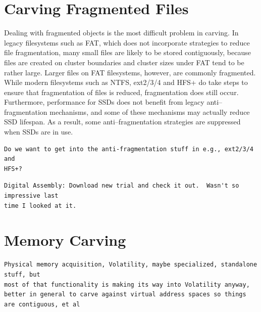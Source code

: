 \section{Carving Fragmented Files}

Dealing with fragmented objects is the most difficult problem in carving.  In legacy filesystems such as FAT, which does not incorporate strategies to reduce file fragmentation, many small files are likely to be stored contiguously, because files are created on cluster boundaries and cluster sizes under FAT tend to be rather large.  Larger files on FAT filesystems, however, are commonly fragmented\cite{dfrws2007:SimsonLGarfinkel}.  While modern filesystems such as NTFS, ext2/3/4 and HFS+ do take steps to ensure that fragmentation of files is reduced, fragmentation does still occur.  Furthermore, performance for SSDs does not benefit from legacy anti--fragmentation mechanisms, and some of these mechanisms may actually reduce SSD lifespan.  As a result, some anti--fragmentation strategies are suppressed when SSDs are in use.  

\begin{Verbatim}
Do we want to get into the anti-fragmentation stuff in e.g., ext2/3/4 and 
HFS+?
\end{Verbatim}

\begin{Verbatim}
Digital Assembly: Download new trial and check it out.  Wasn't so impressive last
time I looked at it.
\end{Verbatim}

\section{Memory Carving}

\begin{Verbatim}
Physical memory acquisition, Volatility, maybe specialized, standalone stuff, but
most of that functionality is making its way into Volatility anyway, better in general to carve against virtual address spaces so things are contiguous, et al



\end{Verbatim}
